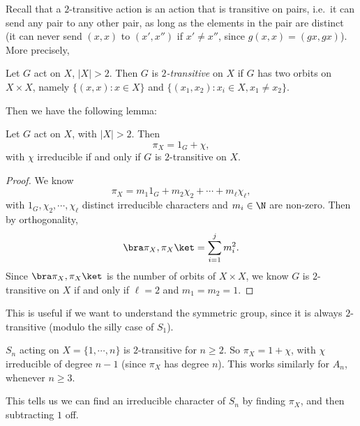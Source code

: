 \documentclass[a4paper]{article}
\begin{document}
Recall that a $2$-transitive action is an action that is transitive on pairs, i.e.\ it can send any pair to any other pair, as long as the elements in the pair are distinct (it can never send $(x, x)$ to $(x', x'')$ if $x' \not= x''$, since $g(x, x) = (gx, gx)$). More precisely,
\begin{defi}[$2$-transitive]
  Let $G$ act on $X$, $|X| > 2$. Then $G$ is \emph{$2$-transitive} on $X$ if $G$ has two orbits on $X \times X$, namely $\{(x, x): x \in X\}$ and $\{(x_1, x_2): x_i \in X, x_1 \not= x_2\}$.
\end{defi}
Then we have the following lemma:

\begin{lemma}
  Let $G$ act on $X$, with $|X| > 2$. Then
  \[
    \pi_X = 1_G + \chi,
  \]
  with $\chi$ irreducible if and only if $G$ is $2$-transitive on $X$.
\end{lemma}

\begin{proof}
  We know
  \[
    \pi_X = m_1 1_G + m_2 \chi_2 + \cdots + m_\ell \chi_\ell,
  \]
  with $1_G, \chi_2, \cdots, \chi_\ell$ distinct irreducible characters and $m_i \in \N$ are non-zero. Then by orthogonality,
  \[
    \bra \pi_X, \pi_X\ket = \sum_{i = 1}^j m_i^2.
  \]
  Since $\bra \pi_X, \pi_X\ket$ is the number of orbits of $X \times X$, we know $G$ is $2$-transitive on $X$ if and only if $\ell = 2$ and $m_1 = m_2 = 1$.
\end{proof}

This is useful if we want to understand the symmetric group, since it is always $2$-transitive (modulo the silly case of $S_1$).
\begin{eg}
  $S_n$ acting on $X = \{1, \cdots, n\}$ is $2$-transitive for $n \geq 2$. So $\pi_X = 1 + \chi$, with $\chi$ irreducible of degree $n - 1$ (since $\pi_X$ has degree $n$). This works similarly for $A_n$, whenever $n \geq 3$.
\end{eg}
This tells us we can find an irreducible character of $S_n$ by finding $\pi_X$, and then subtracting $1$ off.
\end{document}
